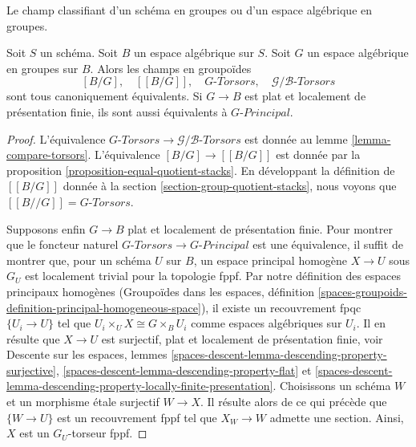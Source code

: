\begin{lemma}
\label{lemma-classifying-stacks}
\begin{slogan}
Le champ classifiant d'un schéma en groupes ou d'un espace algébrique en groupes.
\end{slogan}
Soit $S$ un schéma. Soit $B$ un espace algébrique sur $S$.
Soit $G$ un espace algébrique en groupes sur $B$. Alors les champs
en groupoïdes
$$
[B/G],\quad
[[B/G]],\quad
G\textit{-Torsors},\quad
\mathcal{G}/\mathcal{B}\textit{-Torsors}
$$
sont tous canoniquement équivalents.
Si $G \to B$ est plat et localement
de présentation finie, ils sont aussi équivalents à
$G\textit{-Principal}$.
\end{lemma}

\begin{proof}
L'équivalence
$G\textit{-Torsors} \to \mathcal{G}/\mathcal{B}\textit{-Torsors}$
est donnée au lemme \ref{lemma-compare-torsors}.
L'équivalence $[B/G] \to [[B/G]]$ est donnée par la
proposition \ref{proposition-equal-quotient-stacks}.
En développant la définition de $[[B/G]]$ donnée à la
section \ref{section-group-quotient-stacks},
nous voyons que $[[B//G]] = G\textit{-Torsors}$.

\medskip\noindent
Supposons enfin $G \to B$ plat et localement de présentation finie.
Pour montrer que le foncteur naturel
$G\textit{-Torsors} \to G\textit{-Principal}$ est une équivalence,
il suffit de montrer que, pour un schéma $U$ sur $B$,
un espace principal homogène $X \to U$ sous $G_U$
est localement trivial pour la topologie fppf. Par notre définition des espaces principaux homogènes
(Groupoïdes dans les espaces,
définition \ref{spaces-groupoids-definition-principal-homogeneous-space}),
il existe un recouvrement fpqc $\{U_i \to U\}$ tel que
$U_i \times_U X \cong G \times_B U_i$ comme espaces algébriques sur $U_i$.
Il en résulte que $X \to U$ est surjectif, plat et localement de présentation
finie, voir
Descente sur les espaces, lemmes
\ref{spaces-descent-lemma-descending-property-surjective},
\ref{spaces-descent-lemma-descending-property-flat} et
\ref{spaces-descent-lemma-descending-property-locally-finite-presentation}.
Choisissons un schéma $W$ et un morphisme étale surjectif $W \to X$.
Il résulte alors de ce qui précède que $\{W \to U\}$ est un recouvrement fppf
tel que $X_W \to W$ admette une section. Ainsi, $X$ est un $G_U$-torseur fppf.
\end{proof}

